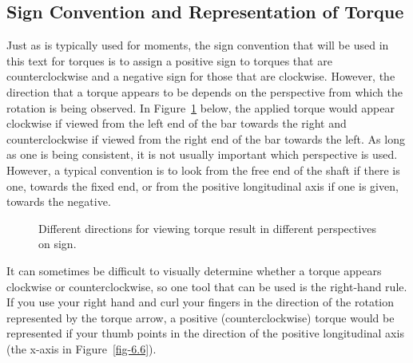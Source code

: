 \documentclass[
  letterpaper,
  DIV=11,
  numbers=noendperiod]{scrreprt}
\theoremstyle{definition}
\theoremstyle{remark}
\begin{document}
\subsection{Sign Convention and Representation of
Torque}\label{sign-convention-and-representation-of-torque}

Just as is typically used for moments, the sign convention that will be
used in this text for torques is to assign a positive sign to torques
that are counterclockwise and a negative sign for those that are
clockwise. However, the direction that a torque appears to be depends on
the perspective from which the rotation is being observed. In
Figure~\ref{fig-6.5} below, the applied torque would appear clockwise if
viewed from the left end of the bar towards the right and
counterclockwise if viewed from the right end of the bar towards the
left. As long as one is being consistent, it is not usually important
which perspective is used. However, a typical convention is to look from
the free end of the shaft if there is one, towards the fixed end, or
from the positive longitudinal axis if one is given, towards the
negative.

\begin{figure}


\caption{\label{fig-6.5}Different directions for viewing torque result
in different perspectives on sign.}

\end{figure}%

It can sometimes be difficult to visually determine whether a torque
appears clockwise or counterclockwise, so one tool that can be used is
the right-hand rule. If you use your right hand and curl your fingers in
the direction of the rotation represented by the torque arrow, a
positive (counterclockwise) torque would be represented if your thumb
points in the direction of the positive longitudinal axis (the x-axis in
Figure~\ref{fig-6.6}).
\end{document}
